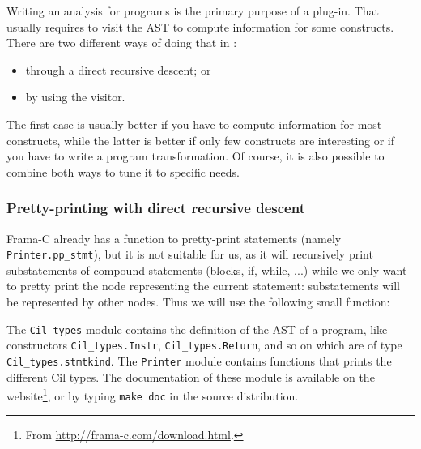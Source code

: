 Writing an analysis for \C programs is the primary purpose of a \framac
plug-in. That usually requires to visit the AST to compute information for some
\C constructs. There are two different ways of doing that in \framac:
\begin{itemize}
\item through a direct recursive descent; or
\item by using the \framac visitor.
\end{itemize}
The first case is usually better if you have to compute information for most \C
constructs, while the latter is better if only few \C constructs are interesting
or if you have to write a program transformation. Of course, it is also possible
to combine both ways to tune it to specific needs.

\subsubsection*{Pretty-printing with direct recursive descent}

Frama-C already has a function to pretty-print statements (namely
\texttt{Printer.pp\_stmt}), but it is not suitable
for us, as it will recursively print substatements of compound statements
(blocks, if, while, ...) while we only want to pretty print the node representing the
current statement: substatements will be represented by other nodes. Thus we
will use the following small function:

The \texttt{Cil\_types} module contains the definition of the AST of a \C
program, like constructors \texttt{Cil\_types.Instr},
\texttt{Cil\_types.Return}, and so on which are of type
\texttt{Cil\_types.stmtkind}. The \texttt{Printer} module contains
functions that prints the different Cil types. The documentation of these module
is available on the \framac website\footnote{From
  \url{http://frama-c.com/download.html}.}, or by typing \texttt{make doc} in
the \framac source distribution.

